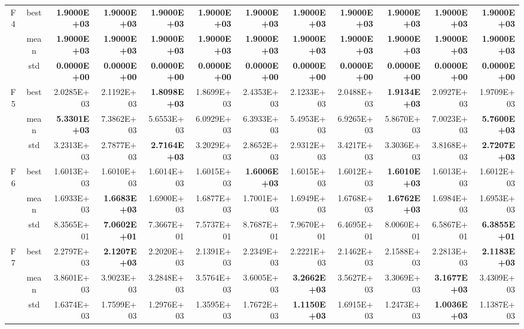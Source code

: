 \documentclass{wzuthesis}
\begin{document}
\begin{landscape}
\begin{table}[htbp]
\begin{tabular}{ccrrrrrrrrrr}
    \multirow{3}[0]{*}{F4} & best  & \textbf{1.9000E+03} & \textbf{1.9000E+03} & \textbf{1.9000E+03} & \textbf{1.9000E+03} & \textbf{1.9000E+03} & \textbf{1.9000E+03} & \textbf{1.9000E+03} & \textbf{1.9000E+03} & \textbf{1.9000E+03} & \textbf{1.9000E+03} \\
          & mean  & \textbf{1.9000E+03} & \textbf{1.9000E+03} & \textbf{1.9000E+03} & \textbf{1.9000E+03} & \textbf{1.9000E+03} & \textbf{1.9000E+03} & \textbf{1.9000E+03} & \textbf{1.9000E+03} & \textbf{1.9000E+03} & \textbf{1.9000E+03} \\
          & std   & \textbf{0.0000E+00} & \textbf{0.0000E+00} & \textbf{0.0000E+00} & \textbf{0.0000E+00} & \textbf{0.0000E+00} & \textbf{0.0000E+00} & \textbf{0.0000E+00} & \textbf{0.0000E+00} & \textbf{0.0000E+00} & \textbf{0.0000E+00} \\
    \multirow{3}[0]{*}{F5} & best  & 2.0285E+03 & 2.1192E+03 & \textbf{1.8098E+03} & 1.8699E+03 & 2.4353E+03 & 2.1233E+03 & 2.0488E+03 & \textbf{1.9134E+03} & 2.0927E+03 & 1.9709E+03 \\
          & mean  & \textbf{5.3301E+03} & 7.3862E+03 & 5.6553E+03 & 6.0929E+03 & 6.3933E+03 & 5.4953E+03 & 6.9265E+03 & 5.8670E+03 & 7.0023E+03 & \textbf{5.7600E+03} \\
          & std   & 3.2313E+03 & 2.7877E+03 & \textbf{2.7164E+03} & 3.2029E+03 & 2.8652E+03 & 2.9312E+03 & 3.4217E+03 & 3.3036E+03 & 3.8168E+03 & \textbf{2.7207E+03} \\
    \multirow{3}[0]{*}{F6} & best  & 1.6013E+03 & 1.6010E+03 & 1.6014E+03 & 1.6015E+03 & \textbf{1.6006E+03} & 1.6015E+03 & 1.6012E+03 & \textbf{1.6010E+03} & 1.6013E+03 & 1.6012E+03 \\
          & mean  & 1.6933E+03 & \textbf{1.6683E+03} & 1.6900E+03 & 1.6877E+03 & 1.7001E+03 & 1.6949E+03 & 1.6768E+03 & \textbf{1.6762E+03} & 1.6984E+03 & 1.6953E+03 \\
          & std   & 8.3565E+01 & \textbf{7.0602E+01} & 7.3667E+01 & 7.5737E+01 & 8.7687E+01 & 7.9670E+01 & 6.4695E+01 & 8.0060E+01 & 6.5867E+01 & \textbf{6.3855E+01} \\
    \multirow{3}[0]{*}{F7} & best  & 2.2797E+03 & \textbf{2.1207E+03} & 2.2020E+03 & 2.1391E+03 & 2.2349E+03 & 2.2221E+03 & 2.1462E+03 & 2.1588E+03 & 2.2813E+03 & \textbf{2.1183E+03} \\
          & mean  & 3.8601E+03 & 3.9023E+03 & 3.2848E+03 & 3.5764E+03 & 3.6005E+03 & \textbf{3.2662E+03} & 3.5627E+03 & 3.3069E+03 & \textbf{3.1677E+03} & 3.4309E+03 \\
          & std   & 1.6374E+03 & 1.7599E+03 & 1.2976E+03 & 1.3595E+03 & 1.7672E+03 & \textbf{1.1150E+03} & 1.6915E+03 & 1.2473E+03 & \textbf{1.0036E+03} & 1.1387E+03 \\

\end{tabular}
\end{table}
\end{landscape}
\end{document}
